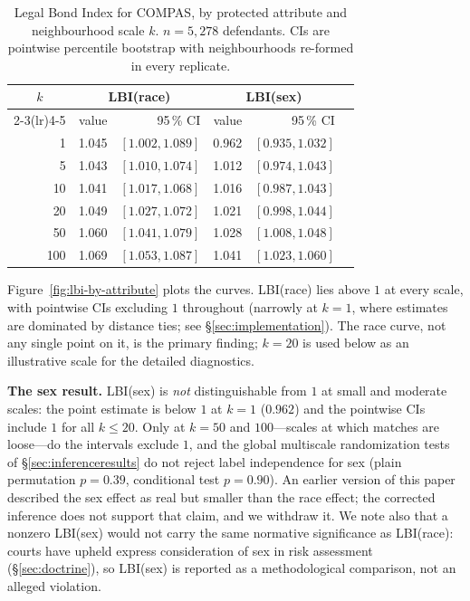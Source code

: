 \documentclass[11pt]{article}
\begin{document}
\begin{table}[h]
\centering
\caption{Legal Bond Index for COMPAS, by protected attribute and
neighbourhood scale $k$. $n = 5{,}278$ defendants. CIs are
pointwise percentile bootstrap with neighbourhoods re-formed in every
replicate.}
\label{tab:lbi}
\begin{tabular}{rrrrrr}
\toprule
\multicolumn{1}{c}{\textbf{$k$}}
 & \multicolumn{2}{c}{\textbf{LBI(race)}}
 & \multicolumn{2}{c}{\textbf{LBI(sex)}} \\
\cmidrule(lr){2-3}\cmidrule(lr){4-5}
 & value & 95\,\% CI & value & 95\,\% CI \\
\midrule
  1 & 1.045 & $[1.002, 1.089]$ & 0.962 & $[0.935, 1.032]$ \\
  5 & 1.043 & $[1.010, 1.074]$ & 1.012 & $[0.974, 1.043]$ \\
 10 & 1.041 & $[1.017, 1.068]$ & 1.016 & $[0.987, 1.043]$ \\
 20 & 1.049 & $[1.027, 1.072]$ & 1.021 & $[0.998, 1.044]$ \\
 50 & 1.060 & $[1.041, 1.079]$ & 1.028 & $[1.008, 1.048]$ \\
100 & 1.069 & $[1.053, 1.087]$ & 1.041 & $[1.023, 1.060]$ \\
\bottomrule
\end{tabular}
\end{table}

Figure~\ref{fig:lbi-by-attribute} plots the curves. LBI(race) lies
above $1$ at every scale, with pointwise CIs excluding $1$ throughout
(narrowly at $k = 1$, where estimates are dominated by distance ties;
see \S\ref{sec:implementation}). The race curve, not any single
point on it, is the primary finding; $k = 20$ is used below as an
illustrative scale for the detailed diagnostics.

\textbf{The sex result.} LBI(sex) is \emph{not} distinguishable from
$1$ at small and moderate scales: the point estimate is below $1$ at
$k = 1$ ($0.962$) and the pointwise CIs include $1$ for all
$k \leq 20$. Only at $k = 50$ and $100$---scales at which matches are
loose---do the intervals exclude $1$, and the global multiscale
randomization tests of \S\ref{sec:inferenceresults} do not reject
label independence for sex (plain permutation $p = 0.39$, conditional
test $p = 0.90$). An earlier version of this paper described the sex
effect as real but smaller than the race effect; the corrected
inference does not support that claim, and we withdraw it. We note
also that a nonzero LBI(sex) would not carry the same normative
significance as LBI(race): courts have upheld express consideration
of sex in risk assessment (\S\ref{sec:doctrine}), so LBI(sex) is
reported as a methodological comparison, not an alleged violation.
\end{document}
